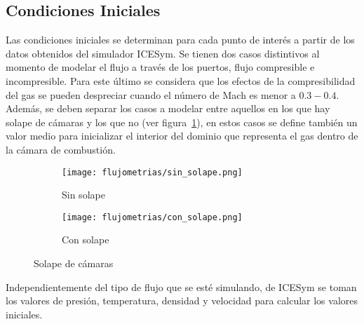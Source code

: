 \subsection{Condiciones Iniciales}
%
Las condiciones iniciales se determinan para cada punto de interés a partir de
los datos obtenidos del simulador ICESym.
%
Se tienen dos casos distintivos al momento de modelar el flujo a través de los
puertos, flujo compresible e incompresible.
%
Para este último se considera que los efectos de la compresibilidad del gas se
pueden despreciar cuando el número de Mach es menor a $0.3-0.4$.
%
Además, se deben separar los casos a modelar entre aquellos en los que hay
solape de cámaras y los que no (ver figura~\ref{fig:solape}), en estos casos se
define también un valor medio para inicializar el interior del dominio que
representa el gas dentro de la cámara de combustión.

\begin{figure}[t!]
  \centering
    \begin{subfigure}[t]{0.4\textwidth}
        \centering
        \texttt{[image: flujometrias/sin\_solape.png]}
        \caption{Sin solape}
    \end{subfigure}%
    \begin{subfigure}[t]{0.4\textwidth}
        \centering
        \texttt{[image: flujometrias/con\_solape.png]}
        \caption{Con solape}
    \end{subfigure}
  \caption{Solape de cámaras}\label{fig:solape}
\end{figure}

Independientemente del tipo de flujo que se esté simulando, de ICESym se toman
los valores de presión, temperatura, densidad y velocidad para calcular los
valores iniciales.
%

